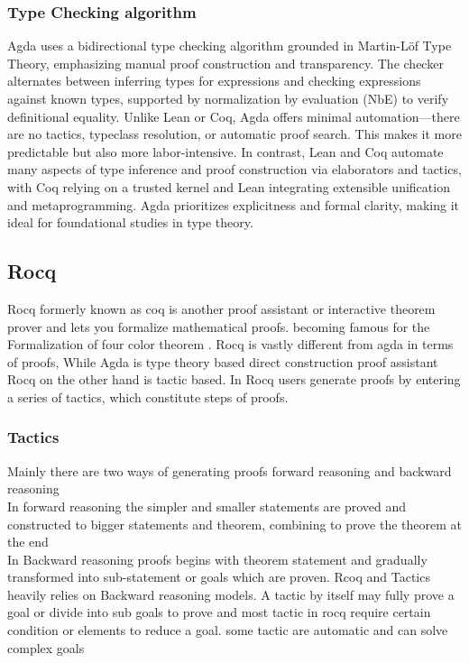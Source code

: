 \documentclass[12pt]{article}
\begin{document}
\subsubsection{ Type Checking algorithm}
Agda uses a bidirectional type checking algorithm grounded in Martin-Löf Type Theory, emphasizing manual proof construction and transparency. The checker alternates between inferring types for expressions and checking expressions against known types, supported by normalization by evaluation (NbE) to verify definitional equality. Unlike Lean or Coq, Agda offers minimal automation—there are no tactics, typeclass resolution, or automatic proof search. This makes it more predictable but also more labor-intensive. In contrast, Lean and Coq automate many aspects of type inference and proof construction via elaborators and tactics, with Coq relying on a trusted kernel and Lean integrating extensible unification and metaprogramming. Agda prioritizes explicitness and formal clarity, making it ideal for foundational studies in type theory.
\cite{depPUlf}
\subsection{Rocq}
Rocq formerly known as coq is another proof assistant or interactive theorem prover and lets you formalize mathematical proofs. becoming famous for the Formalization of four color theorem  .
Rocq is vastly different from agda in terms of proofs, While Agda is type theory based direct construction proof assistant Rocq on the other hand is tactic based. 
In Rocq users generate proofs by entering a series of tactics, which constitute steps of proofs. \cite{rocq_manual}
\subsubsection{Tactics}
    Mainly there are two ways of generating proofs forward reasoning and backward reasoning  \\ 
    In forward reasoning the simpler and smaller statements are proved and constructed to bigger statements and theorem, combining to prove the theorem at the end \\
    In Backward reasoning proofs begins with theorem statement and gradually transformed into sub-statement or goals which are proven. 
    Rcoq and Tactics heavily relies on Backward reasoning models.
    A tactic by itself may fully prove a goal or divide into sub goals to prove and most tactic in rocq require certain condition or elements to reduce a goal.
    some tactic are automatic and can solve complex goals\\ \cite{rocq_tactics}
\end{document}
